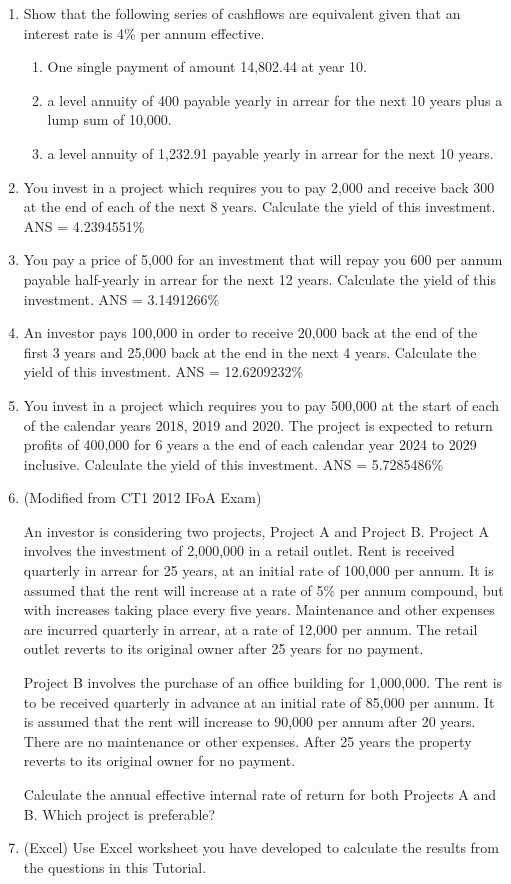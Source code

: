 \documentclass[
]{book}
\theoremstyle{definition}
\theoremstyle{definition}
\theoremstyle{definition}
\theoremstyle{definition}
\theoremstyle{remark}
\begin{document}
\begin{enumerate}
\def\labelenumi{\arabic{enumi}.}
\item
  Show that the following series of cashflows are equivalent given
  that an interest rate is 4\% per annum effective.

  \begin{enumerate}
  \def\labelenumii{\arabic{enumii}.}
  \item
    One single payment of amount 14,802.44 at year 10.
  \item
    a level annuity of 400 payable yearly in arrear for the next 10
    years plus a lump sum of 10,000.
  \item
    a level annuity of 1,232.91 payable yearly in arrear for the
    next 10 years.
  \end{enumerate}
\item
  You invest in a project which requires you to pay 2,000 and receive
  back 300 at the end of each of the next 8 years. Calculate the yield
  of this investment. ANS = 4.2394551\%
\item
  You pay a price of 5,000 for an investment that will repay you 600
  per annum payable half-yearly in arrear for the next 12 years.
  Calculate the yield of this investment. ANS = 3.1491266\%
\item
  An investor pays 100,000 in order to receive 20,000 back at the end
  of the first 3 years and 25,000 back at the end in the next 4 years.
  Calculate the yield of this investment. ANS = 12.6209232\%
\item
  You invest in a project which requires you to pay 500,000 at the
  start of each of the calendar years 2018, 2019 and 2020. The project
  is expected to return profits of 400,000 for 6 years a the end of
  each calendar year 2024 to 2029 inclusive. Calculate the yield of
  this investment. ANS = 5.7285486\%
\item
  (Modified from CT1 2012 IFoA Exam)

  An investor is considering two projects, Project A and Project B.
  Project A involves the investment of 2,000,000 in a retail outlet.
  Rent is received quarterly in arrear for 25 years, at an initial
  rate of 100,000 per annum. It is assumed that the rent will increase
  at a rate of 5\% per annum compound, but with increases taking place
  every five years. Maintenance and other expenses are incurred
  quarterly in arrear, at a rate of 12,000 per annum. The retail
  outlet reverts to its original owner after 25 years for no payment.

  Project B involves the purchase of an office building for 1,000,000.
  The rent is to be received quarterly in advance at an initial rate
  of 85,000 per annum. It is assumed that the rent will increase to
  90,000 per annum after 20 years. There are no maintenance or other
  expenses. After 25 years the property reverts to its original owner
  for no payment.

  Calculate the annual effective internal rate of return for both
  Projects A and B. Which project is preferable?
\item
  (Excel) Use Excel worksheet you have developed to calculate the
  results from the questions in this Tutorial.
\end{enumerate}
\end{document}
